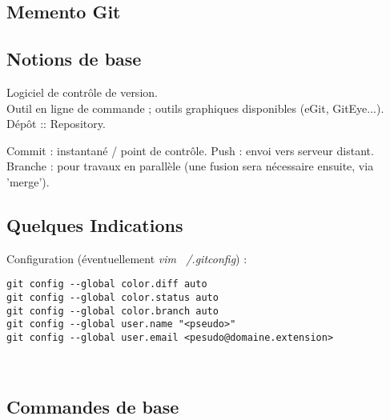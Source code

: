 \documentclass[11pt,twoside,a4paper]{article}
\begin{document}
\begin{landscape}



\begin{multicols}{2}
	\section*{Memento Git}
	
	\subsection*{Notions de base}
	
	Logiciel de contr{\^o}le de version. ~\\
	
	Outil en ligne de commande ; outils graphiques disponibles (eGit, GitEye...). ~\\
	
	D{\'e}p{\^o}t :: Repository. 
	
	Commit : instantan{\'e} / point de contr{\^o}le. 
	Push : envoi vers serveur distant. 
	Branche : pour travaux en parall{\`e}le (une fusion sera n{\'e}cessaire ensuite, via 'merge'). 
	
	\subsection*{Quelques Indications}
	
	Configuration ({\'e}ventuellement \emph{vim ~/.gitconfig}) : 
	
	\begin{verbatim}
git config --global color.diff auto
git config --global color.status auto
git config --global color.branch auto
git config --global user.name "<pseudo>"
git config --global user.email <pesudo@domaine.extension>
	\end{verbatim}
	
	\vfill~\\
	\columnbreak
	
	\subsection*{Commandes de base}
	

\end{multicols}
\end{landscape}
\end{document}
